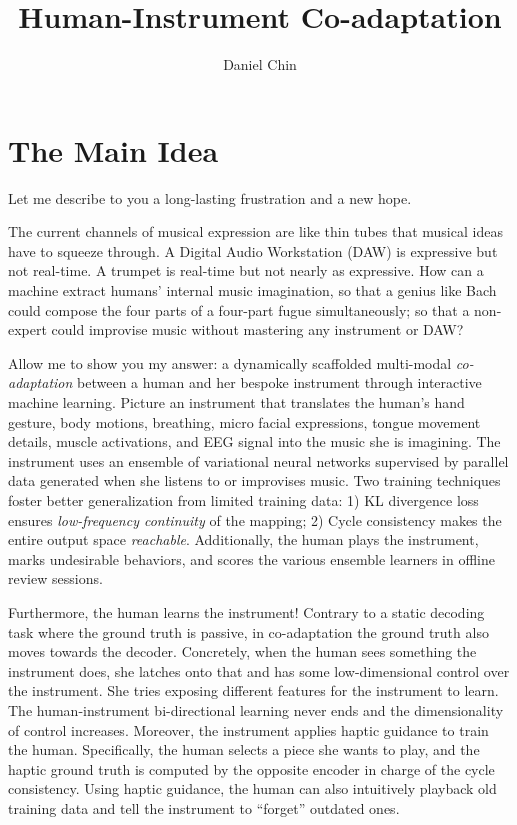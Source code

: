 \documentclass{article}
\title{Human-Instrument Co-adaptation}
\author{Daniel Chin}
\begin{document}
\maketitle

\section{The Main Idea}
Let me describe to you a long-lasting frustration and a new hope. 

The current channels of musical expression are like thin tubes that musical ideas have to squeeze through. A Digital Audio Workstation (DAW) is expressive but not real-time. A trumpet is real-time but not nearly as expressive. How can a machine extract humans' internal music imagination, so that a genius like Bach could compose the four parts of a four-part fugue simultaneously; so that a non-expert could improvise music without mastering any instrument or DAW? 

Allow me to show you my answer: a dynamically scaffolded multi-modal \textit{co-adaptation} between a human and her bespoke instrument through interactive machine learning. Picture an instrument that translates the human’s hand gesture, body motions, breathing, micro facial expressions, tongue movement details, muscle activations, and EEG signal into the music she is imagining. The instrument uses an ensemble of variational neural networks supervised by parallel data generated when she listens to or improvises music. Two training techniques foster better generalization from limited training data: 1) KL divergence loss ensures \textit{low-frequency continuity} of the mapping; 2) Cycle consistency makes the entire output space \textit{reachable}. Additionally, the human plays the instrument, marks undesirable behaviors, and scores the various ensemble learners in offline review sessions. 

Furthermore, the human learns the instrument! Contrary to a static decoding task where the ground truth is passive, in co-adaptation the ground truth also moves towards the decoder. Concretely, when the human sees something the instrument does, she latches onto that and has some low-dimensional control over the instrument. She tries exposing different features for the instrument to learn. The human-instrument bi-directional learning never ends and the dimensionality of control increases. Moreover, the instrument applies haptic guidance to train the human. Specifically, the human selects a piece she wants to play, and the haptic ground truth is computed by the opposite encoder in charge of the cycle consistency. Using haptic guidance, the human can also intuitively playback old training data and tell the instrument to “forget” outdated ones. 
\end{document}

